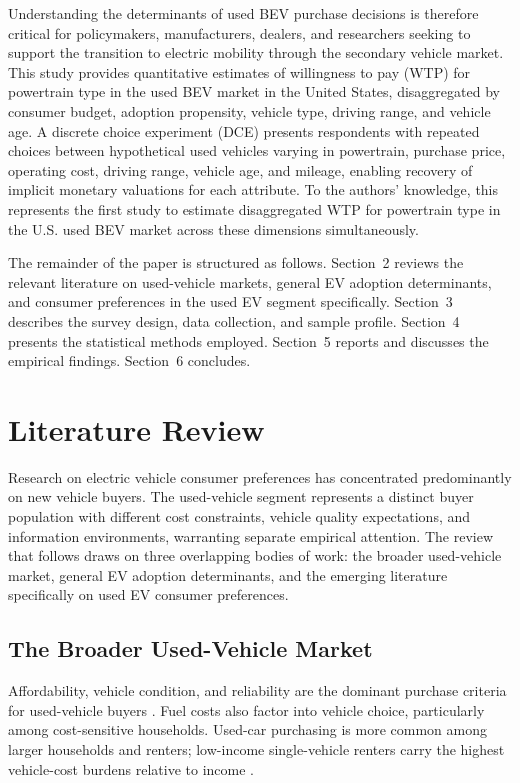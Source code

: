 \documentclass[a4paper,fleqn]{cas-sc}   %
\begin{document}
Understanding the determinants of used BEV purchase decisions is therefore critical for policymakers, manufacturers, dealers, and researchers seeking to support the transition to electric mobility through the secondary vehicle market. This study provides quantitative estimates of willingness to pay (WTP) for powertrain type in the used BEV market in the United States, disaggregated by consumer budget, adoption propensity, vehicle type, driving range, and vehicle age. A discrete choice experiment (DCE) presents respondents with repeated choices between hypothetical used vehicles varying in powertrain, purchase price, operating cost, driving range, vehicle age, and mileage, enabling recovery of implicit monetary valuations for each attribute. To the authors’ knowledge, this represents the first study to estimate disaggregated WTP for powertrain type in the U.S. used BEV market across these dimensions simultaneously.

The remainder of the paper is structured as follows. Section~2 reviews the relevant literature on used-vehicle markets, general EV adoption determinants, and consumer preferences in the used EV segment specifically. Section~3 describes the survey design, data collection, and sample profile. Section~4 presents the statistical methods employed. Section~5 reports and discusses the empirical findings. Section~6 concludes.

\section{Literature Review}

Research on electric vehicle consumer preferences has concentrated predominantly on new vehicle buyers. The used-vehicle segment represents a distinct buyer population with different cost constraints, vehicle quality expectations, and information environments, warranting separate empirical attention. The review that follows draws on three overlapping bodies of work: the broader used-vehicle market, general EV adoption determinants, and the emerging literature specifically on used EV consumer preferences.

\subsection{The Broader Used-Vehicle Market}

Affordability, vehicle condition, and reliability are the dominant purchase criteria for used-vehicle buyers \parencite{consumerreports_usedcar, epa_usedvehicle}. Fuel costs also factor into vehicle choice, particularly among cost-sensitive households. Used-car purchasing is more common among larger households and renters; low-income single-vehicle renters carry the highest vehicle-cost burdens relative to income \parencite{konstantinou2024usedEV_price}.
\end{document}
